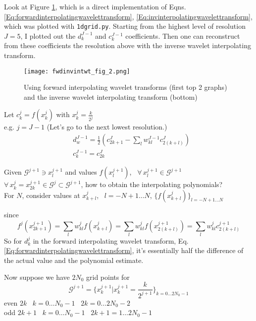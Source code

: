 \documentclass[twoside]{amsart}
\theoremstyle{plain}
\theoremstyle{definition}
\theoremstyle{remark}
\numberwithin{equation}{section}
\begin{document}
Look at Figure \ref{Fig:fwdinvintwt_fig_2}, which is a direct implementation of Eqns. \ref{Eq:forwardinterpolatingwavelettransform}, \ref{Eq:invinterpolatingwavelettransform}, which was plotted with \verb|1dgrid.py|.  Starting from the highest level of resolution $J=5$, I plotted out the $d^{J-1}_k$ and $c^{J-1}_k$ coefficients.  Then one can reconstruct from these coefficients the resolution above with the inverse wavelet interpolating transform.  

\begin{figure}[h!]\label{Fig:fwdinvintwt_fig_2}
\caption{Using forward interpolating wavelet transforms (first top 2 graphs) and the inverse wavelet interpolating transform (bottom)}
 \centering
   \texttt{[image: fwdinvintwt\_fig\_2.png]}
\end{figure}



Let $c_k^j = f(x_k^j)$ with $x^j_k = \frac{k}{2^j}$ \\
e.g. $j=J-1$ (Let's go to the next lowest resolution.) 
\[
\begin{aligned}
& d^{J-1}_w = \frac{1}{2} ( c^J_{2k+1} - \sum_l w^{J-1}_{kl} c^J_{2(k+l)}  )\\
  & c^{J-1}_k = c^J_{2k}
\end{aligned}
\]

Given $\mathcal{G}^{j+1} \ni x^{j+1}_l$ and values $f(x_l^{j+1})$, \, $\forall \, x^{j+1}_l \in \mathcal{G}^{j+1}$ \\
$\forall \, x^j_k = x^{j+1}_{2k} \in \mathcal{G}^j \subset \mathcal{G}^{j+1}$, how to obtain the interpolating polynomials?  \\
\phantom{ \quad \, } For $N$, consider values at $x^j_{k+l}$, \, $l=-N+1 \dots N$, $\lbrace f(x^j_{k+l})\rbrace_{l=-N+1 \dots N }$  

since 
\[
f^j(x^{j+1}_{2k+1}) = \sum_l w^j_{kl} f(x^j_{k+l})  =\sum_l w^j_{kl} f(x^{j+1}_{2(k+l)}) = \sum_l w^j_{kl} c^{j+1}_{2(k+l)}
\]
So for $d_k^j$ in the forward interpolating wavelet transform, Eq. \ref{Eq:forwardinterpolatingwavelettransform}, it's essentially half the difference of the actual value and the polynomial estimate.  

Now suppose we have $2N_0$ grid points for 
\[
\mathcal{G}^{j+1} = \lbrace x^{j+1}_k | x^{j+1}_k = \frac{k}{2^{j+1}} \rbrace_{k=0 \dots 2N_0 - 1}
\]
even $2k$ \quad \, $k=0\dots N_0 -1$ \quad \, $2k= 0\dots 2N_0 -2 $ \\
odd $2k+1$ \quad \, $k=0\dots N_0 -1$ \quad \, $2k+1 = 1 \dots 2N_0-1$ \\
\end{document}
